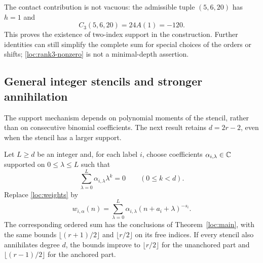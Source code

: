 The contact contribution is not vacuous: the admissible tuple
$(5,6,20)$ has $h=1$ and
\begin{equation}
 C_3(5,6,20)=24A(1)=-120.
 \label{loc:rank3-nonzero}
\end{equation}
This proves the existence of two-index support in the construction.
Further identities can still simplify the complete sum for special
choices of the orders or shifts; \eqref{loc:rank3-nonzero} is not a
minimal-depth assertion.

\subsection{General integer stencils and stronger annihilation}

The support mechanism depends on polynomial moments of the stencil,
rather than on consecutive binomial coefficients.  The next result
retains $d=2r-2$, even when the stencil has a larger support.

\begin{corollary}
\label{loc:general-stencil}
Let $L\ge d$ be an integer and, for each label $i$, choose coefficients
$\alpha_{i,\lambda}\in\mathbb C$ supported on $0\le\lambda\le L$ such that
\begin{equation}
 \sum_{\lambda=0}^L\alpha_{i,\lambda}\lambda^k=0
                      \qquad(0\le k<d).
 \label{loc:stencil-moments}
\end{equation}
Replace \eqref{loc:weights} by
\[
 w_{i,\alpha}(n)=\sum_{\lambda=0}^L
                     \alpha_{i,\lambda}(n+a_i+\lambda)^{-s_i}.
\]
The corresponding ordered sum has the conclusions of
Theorem~\ref{loc:main}, with the same bounds
$\lfloor(r+1)/2\rfloor$ and $\lfloor r/2\rfloor$ on its free indices.
If every stencil also annihilates degree $d$, the bounds improve to
$\lfloor r/2\rfloor$ for the unanchored part and
$\lfloor(r-1)/2\rfloor$ for the anchored part.
\end{corollary}

